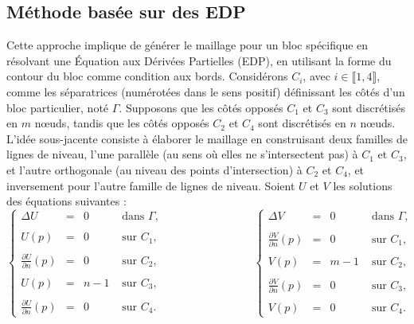\subsection{Méthode basée sur des EDP}
\label{method_based_edp}
Cette approche implique de générer le maillage pour un bloc spécifique en résolvant une Équation aux Dérivées Partielles (EDP), en utilisant la forme du contour du bloc comme condition aux bords. Considérons $C_i$, avec $i \in \llbracket 1, 4 \rrbracket$, comme les séparatrices (numérotées dans le sens positif) définissant les côtés d'un bloc particulier, noté $\Gamma$. Supposons que les côtés opposés $C_1$ et $C_3$ sont discrétisés en $m$ nœuds, tandis que les côtés opposés $C_2$ et $C_4$ sont discrétisés en $n$ nœuds. L'idée sous-jacente consiste à élaborer le maillage en construisant deux familles de lignes de niveau, l'une parallèle (au sens où elles ne s'intersectent pas) à $C_1$ et $C_3$, et l'autre orthogonale (au niveau des points d'intersection) à $C_2$ et $C_4$, et inversement pour l'autre famille de lignes de niveau. Soient $U$ et $V$ les solutions des équations suivantes :
$$
\left\{
\begin{array}{lcll}
\Delta U &=& 0 &\mbox{ dans }\Gamma,\\\\
U(p)&=& 0 & \mbox{ sur } C_1,\\\\
\displaystyle\frac{\partial U}{\partial n}(p)&=&0 & \mbox{ sur } C_2,\\\\
U(p)&=& n-1 & \mbox{ sur } C_3,\\\\
\displaystyle\frac{\partial U}{\partial n}(p)&=&0 & \mbox{ sur } C_4.
\end{array}
\right.
\quad\quad\quad\quad\quad\quad\quad\quad
\left\{
\begin{array}{lcll}
\Delta V &=& 0 &\mbox{ dans }\Gamma,\\\\
\displaystyle\frac{\partial V}{\partial n}(p)&=&0 & \mbox{ sur } C_1,\\\\
V(p)&=& m-1 & \mbox{ sur } C_2,\\\\
\displaystyle\frac{\partial V}{\partial n}(p)&=&0 & \mbox{ sur } C_3,\\\\
V(p)&=& 0 & \mbox{ sur } C_4.
\end{array}
\right.
$$
\[\]
